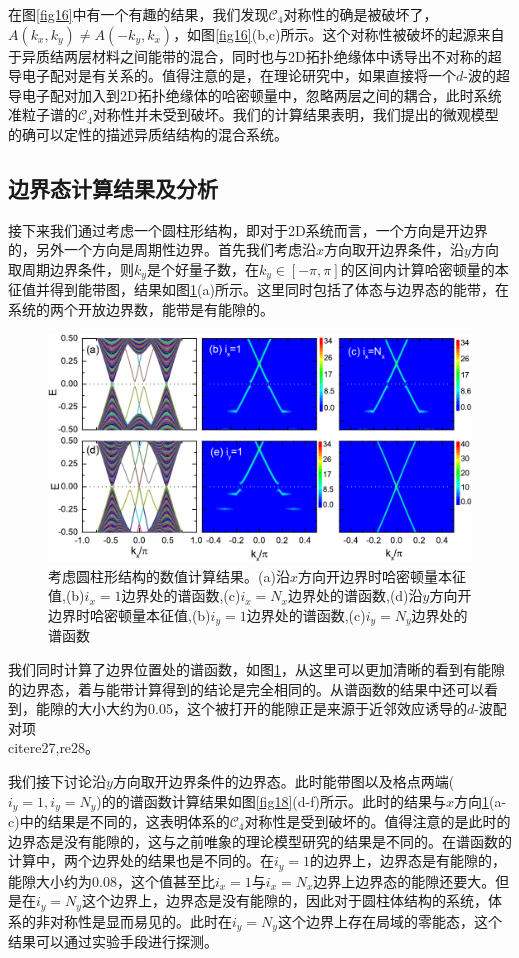  在图\ref{fig16}中有一个有趣的结果，我们发现$\mathcal{C}_4$对称性的确是被破坏了，$A(k_x,k_y)\neq A(-k_y,k_x)$，如图\ref{fig16}(b,c)所示。这个对称性被破坏的起源来自于异质结两层材料之间能带的混合，同时也与2D拓扑绝缘体中诱导出不对称的超导电子配对是有关系的。值得注意的是，在理论研究中，如果直接将一个$d$-波的超导电子配对加入到2D拓扑绝缘体的哈密顿量中，忽略两层之间的耦合，此时系统准粒子谱的$\mathcal{C}_4$对称性并未受到破坏。我们的计算结果表明，我们提出的微观模型的确可以定性的描述异质结结构的混合系统。
\subsection{边界态计算结果及分析}
 接下来我们通过考虑一个圆柱形结构，即对于2D系统而言，一个方向是开边界的，另外一个方向是周期性边界。首先我们考虑沿$x$方向取开边界条件，沿$y$方向取周期边界条件，则$k_y$是个好量子数，在$k_y\in\left[-\pi,\pi\right]$的区间内计算哈密顿量的本征值并得到能带图，结果如图\ref{fig17}(a)所示。这里同时包括了体态与边界态的能带，在系统的两个开放边界数，能带是有能隙的。
\begin{figure}[h]
	\centering
	\includegraphics[scale=0.7]{pic/fig18.pdf}
	\caption{考虑圆柱形结构的数值计算结果。(a)沿$x$方向开边界时哈密顿量本征值,(b)$i_x=1$边界处的谱函数,(c)$i_x=N_x$边界处的谱函数,(d)沿$y$方向开边界时哈密顿量本征值,(b)$i_y=1$边界处的谱函数,(c)$i_y=N_y$边界处的谱函数}\label{fig17}
\end{figure}
我们同时计算了边界位置处的谱函数，如图\ref{fig17}，从这里可以更加清晰的看到有能隙的边界态，着与能带计算得到的结论是完全相同的。从谱函数的结果中还可以看到，能隙的大小大约为0.05，这个被打开的能隙正是来源于近邻效应诱导的$d$-波配对项\\cite{re27,re28}。

 我们接下讨论沿$y$方向取开边界条件的边界态。此时能带图以及格点两端($i_y=1,i_y=N_y$)的的谱函数计算结果如图\ref{fig18}(d-f)所示。此时的结果与$x$方向\ref{fig17}(a-c)中的结果是不同的，这表明体系的$\mathcal{C}_4$对称性是受到破坏的。值得注意的是此时的边界态是没有能隙的，这与之前唯象的理论模型研究的结果是不同的\cite{re27,re28}。在谱函数的计算中，两个边界处的结果也是不同的。在$i_y=1$的边界上，边界态是有能隙的，能隙大小约为0.08，这个值甚至比$i_x=1$与$i_x=N_x$边界上边界态的能隙还要大。但是在$i_y=N_y$这个边界上，边界态是没有能隙的，因此对于圆柱体结构的系统，体系的非对称性是显而易见的。此时在$i_y=N_y$这个边界上存在局域的零能态，这个结果可以通过实验手段进行探测。
